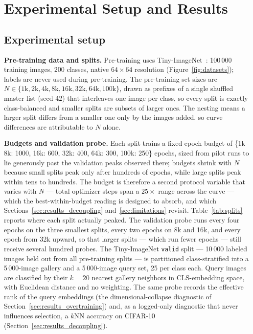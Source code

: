 \section{Experimental Setup and Results}
\label{sec:experiments}

\subsection{Experimental setup}
\label{sec:setup}

\textbf{Pre-training data and splits.}
Pre-training uses Tiny-ImageNet~\cite{le2015tinyimagenet}: 100\,000 training
images, 200 classes, native $64\times64$ resolution
(Figure~\ref{fig:datasets}); labels are never used during pre-training. The
pre-training set sizes are $N \in \{1\mathrm{k}, 2\mathrm{k}, 4\mathrm{k},
8\mathrm{k}, 16\mathrm{k}, 32\mathrm{k}, 64\mathrm{k}, 100\mathrm{k}\}$,
drawn as prefixes of a single shuffled master list (seed 42) that interleaves
one image per class, so every split is exactly class-balanced and smaller
splits are subsets of larger ones. The nesting means a larger split differs
from a smaller one only by the images added, so curve differences are
attributable to $N$ alone.

\textbf{Budgets and validation probe.}
Each split trains a fixed epoch budget of \{1k--8k: 1000, 16k: 600, 32k: 400,
64k: 300, 100k: 250\} epochs, sized from pilot runs to lie generously past
the validation peaks observed there; budgets shrink with $N$ because small
splits peak only after hundreds of epochs, while large splits peak within
tens to hundreds. The budget is therefore a second protocol variable that
varies with $N$ --- total optimizer steps span a $25\times$ range across
the curve --- which the best-within-budget reading is designed to absorb,
and which Sections~\ref{sec:results_decoupling}
and~\ref{sec:limitations} revisit. Table~\ref{tab:splits} reports where
each split actually peaked. The validation probe runs every four epochs on
the three smallest splits, every two epochs on 8k and 16k, and every epoch
from 32k upward, so that larger splits --- which run fewer epochs --- still
receive several hundred probes. The Tiny-ImageNet \texttt{valid} split ---
10\,000 labeled images held out from all pre-training splits --- is
partitioned class-stratified into a 5\,000-image gallery and a 5\,000-image
query set, 25 per class each. Query images are classified by their $k{=}20$
nearest gallery neighbors in CLS-embedding space, with Euclidean distance
and no weighting. The same probe records the effective rank of the query
embeddings (the dimensional-collapse diagnostic of
Section~\ref{sec:results_overtraining}) and, as a logged-only diagnostic
that never influences selection, a $k$NN accuracy on CIFAR-10
(Section~\ref{sec:results_decoupling}).

